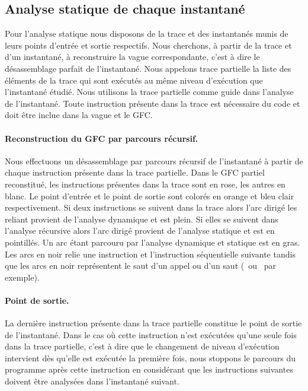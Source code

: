 \subsection{Analyse statique de chaque instantané}
Pour l'analyse statique nous disposons de la trace et des instantanés munis de leurs points d'entrée et sortie respectifs.
Nous cherchons, à partir de la trace et d'un instantané, à reconstruire la vague correspondante, c'est à dire le désassemblage parfait de l'instantané.
Nous appelons trace partielle la liste des éléments de la trace qui sont exécutés au même niveau d'exécution que l'instantané étudié.
Nous utilisons la trace partielle comme guide dans l'analyse de l'instantané. Toute instruction présente dans la trace est nécessaire du code et doit être inclue dans la vague et le GFC.

\paragraph{Reconstruction du GFC par parcours récursif.}
Nous effectuons un désassemblage par parcours récursif de l'instantané à partir de chaque instruction présente dans la trace partielle.
Dans le GFC partiel  reconstitué, les instructions présentes dans la trace sont en rose, les autres en blanc. Le point d'entrée et le point de sortie sont colorés en orange et bleu clair respectivement.
Si deux instructions se suivent dans la trace alors l'arc dirigé les reliant provient de l'analyse dynamique et est plein. Si elles se suivent dans l'analyse récursive alors l'arc dirigé provient de l'analyse statique et est en pointillés. Un arc étant parcouru par l'analyse dynamique et statique est en gras. Les arcs en noir relie une instruction et l'instruction séquentielle suivante tandis que les arcs en noir représentent le saut d'un appel ou d'un saut (\call\ ou \jmp\ par exemple).

\paragraph{Point de sortie.}
La dernière instruction présente dans la trace partielle constitue le point de sortie de l'instantané.
Dans le cas où cette instruction n'est exécutées qu'une seule fois dans la trace partielle, c'est à dire que le changement de niveau d'exécution intervient dès qu'elle est exécutée la première fois, nous stoppons le parcours du programme après cette instruction en considérant que les instructions suivantes doivent être analysées dans l'instantané suivant.

